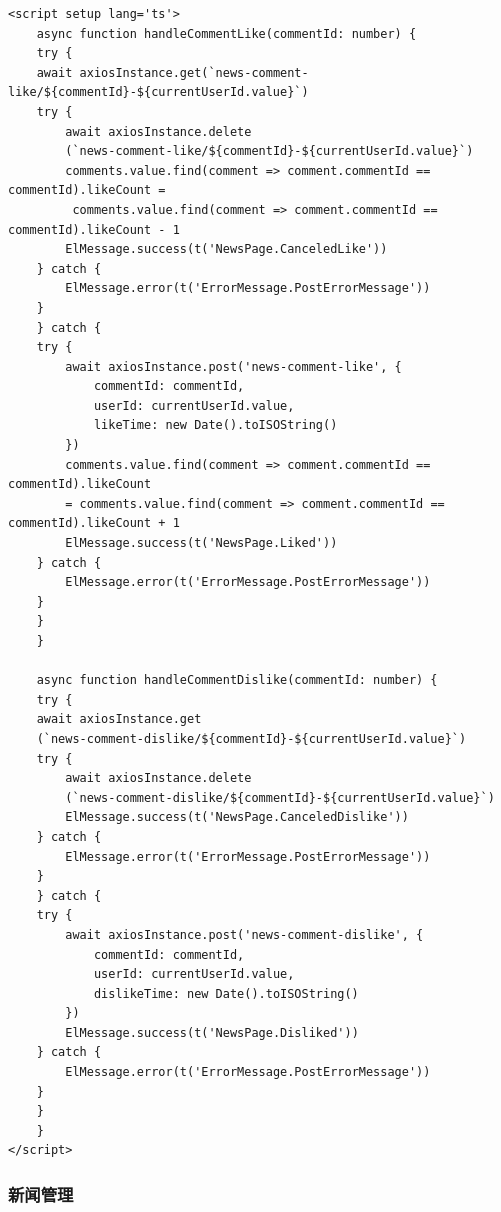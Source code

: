 \begin{itemize}
	\begin{verbatim}
<script setup lang='ts'>
	async function handleCommentLike(commentId: number) {
	try {
	await axiosInstance.get(`news-comment-like/${commentId}-${currentUserId.value}`)
	try {
		await axiosInstance.delete
		(`news-comment-like/${commentId}-${currentUserId.value}`)
		comments.value.find(comment => comment.commentId == commentId).likeCount =
		 comments.value.find(comment => comment.commentId == commentId).likeCount - 1
		ElMessage.success(t('NewsPage.CanceledLike'))
	} catch {
		ElMessage.error(t('ErrorMessage.PostErrorMessage'))
	}
	} catch {
	try {
		await axiosInstance.post('news-comment-like', {
			commentId: commentId,
			userId: currentUserId.value,
			likeTime: new Date().toISOString()
		})
		comments.value.find(comment => comment.commentId == commentId).likeCount 
		= comments.value.find(comment => comment.commentId == commentId).likeCount + 1
		ElMessage.success(t('NewsPage.Liked'))
	} catch {
		ElMessage.error(t('ErrorMessage.PostErrorMessage'))
	}
	}
	}
	
	async function handleCommentDislike(commentId: number) {
	try {
	await axiosInstance.get
	(`news-comment-dislike/${commentId}-${currentUserId.value}`)
	try {
		await axiosInstance.delete
		(`news-comment-dislike/${commentId}-${currentUserId.value}`)
		ElMessage.success(t('NewsPage.CanceledDislike'))
	} catch {
		ElMessage.error(t('ErrorMessage.PostErrorMessage'))
	}
	} catch {
	try {
		await axiosInstance.post('news-comment-dislike', {
			commentId: commentId,
			userId: currentUserId.value,
			dislikeTime: new Date().toISOString()
		})
		ElMessage.success(t('NewsPage.Disliked'))
	} catch {
		ElMessage.error(t('ErrorMessage.PostErrorMessage'))
	}
	}
	}
</script>
	\end{verbatim}
\end{itemize}

\subsubsection{新闻管理}

